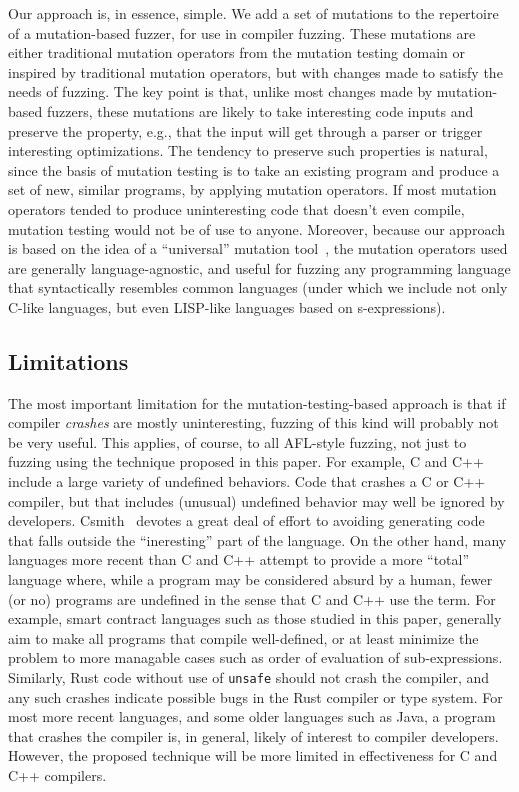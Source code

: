 Our approach is, in essence, simple.  We add a set of mutations to the repertoire of a mutation-based fuzzer, for use in compiler fuzzing.  These mutations are either traditional mutation operators from the mutation testing domain or inspired by traditional mutation operators, but with changes made to satisfy the needs of fuzzing.  The key point is that, unlike most changes made by mutation-based fuzzers, these mutations are likely to take interesting code inputs and preserve the property, e.g., that the input will get through a parser or trigger interesting optimizations.  The tendency to preserve such properties is natural, since the basis of mutation testing is to take an existing program and produce a set of new, similar programs, by applying mutation operators.  If most mutation operators tended to produce uninteresting code that doesn't even compile, mutation testing would not be of use to anyone.  Moreover, because our approach is based on the idea of a ``universal'' mutation tool~\cite{regexpMut}, the mutation operators used are generally language-agnostic, and useful for fuzzing any programming language that syntactically resembles common languages (under which we include not only C-like languages, but even LISP-like languages based on s-expressions).

\subsection{Limitations}

The most important limitation for the mutation-testing-based approach is that if compiler \emph{crashes} are mostly uninteresting, fuzzing of this kind will probably not be very useful.  This applies, of course, to all AFL-style fuzzing, not just to fuzzing using the technique proposed in this paper.  For example, C and C++ include a large variety of undefined behaviors.  Code that crashes a C or C++ compiler, but that includes (unusual) undefined behavior may well be ignored by developers.  Csmith~\cite{csmith} devotes a great deal of effort to avoiding generating code that falls outside the ``ineresting'' part of the language.  On the other hand, many languages more recent than C and C++ attempt to provide a more ``total'' language where, while a program may be considered absurd by a human, fewer (or no) programs are undefined in the sense that C and C++ use the term.  For example, smart contract languages such as those studied in this paper, generally aim to make all programs that compile well-defined, or at least minimize the problem to more managable cases such as order of evaluation of sub-expressions.  Similarly, Rust code without use of {\tt unsafe} should not crash the compiler, and any such crashes indicate possible bugs in the Rust compiler or type system.  For most more recent languages, and some older languages such as Java, a program that crashes the compiler is, in general, likely of interest to compiler developers.  However, the proposed technique will be more limited in effectiveness for C and C++ compilers.